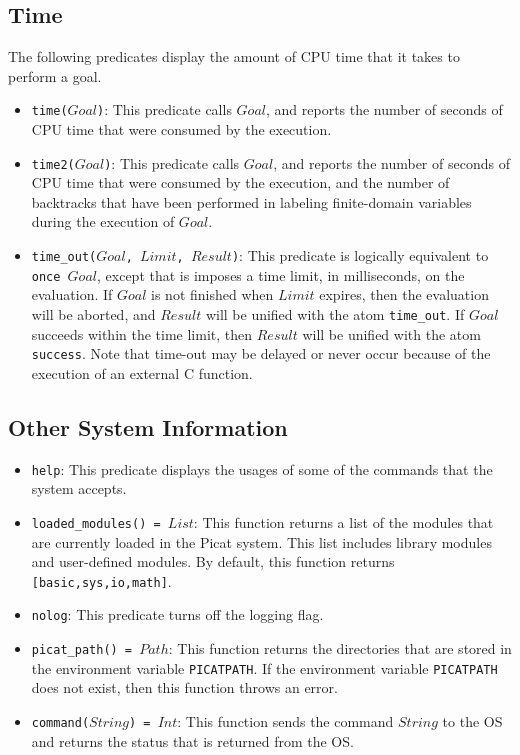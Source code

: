 \subsection{Time}
The following predicates display the amount of CPU time that it takes to perform a goal.
\begin{itemize}
\item \texttt{time($Goal$)}: This predicate calls $Goal$, and reports the number of seconds of CPU time that were consumed by the execution.
\item \texttt{time2($Goal$)}: This predicate calls $Goal$, and reports the number of seconds of CPU time that were consumed by the execution, and the number of backtracks that have been performed in labeling finite-domain variables during the execution of $Goal$.
\item \texttt{time\_out($Goal$, $Limit$, $Result$)}: This predicate is logically equivalent to \texttt{once $Goal$}, except that is imposes a time limit, in milliseconds, on the evaluation.  If $Goal$ is not finished when $Limit$ expires, then the evaluation will be aborted, and $Result$ will be unified with the atom \texttt{time\_out}.  If $Goal$ succeeds within the time limit, then $Result$ will be unified with the atom \texttt{success}. Note that time-out may be delayed or never occur because of the execution of an external C function.
\end{itemize}

\subsection{Other System Information}
\begin{itemize}
\item \texttt{help}: This predicate displays the usages of some of the commands that the system accepts.
\item \texttt{loaded\_modules() = $List$}: This function returns a list of the modules that are currently loaded in the Picat system.  This list includes library modules and user-defined modules.  By default, this function returns \texttt{[basic,sys,io,math]}.
\item \texttt{nolog}: This predicate turns off the logging flag.
\item \texttt{picat\_path() = $Path$}: This function returns the directories that are stored in the environment variable \texttt{PICATPATH}.  If the environment variable \texttt{PICATPATH} does not exist, then this function throws an error.
\item \texttt{command($String$) = $Int$}: This function sends the command $String$ to the OS and returns the status that is returned from the OS.
\end{itemize}

